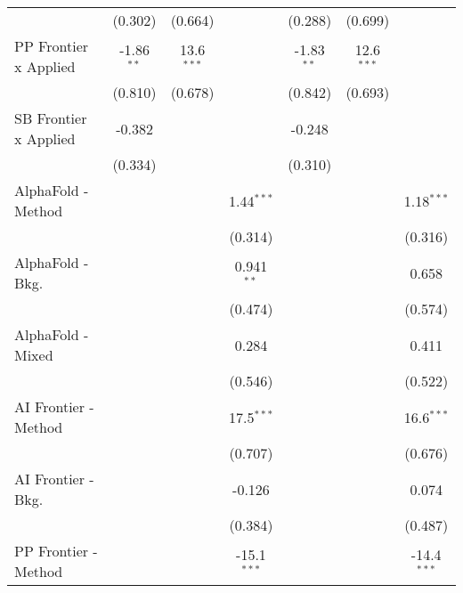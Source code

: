 \begin{tabular}{lcccccc}
                                  & (0.302)       & (0.664)       &                & (0.288)        & (0.699)        &   \\   
   PP Frontier x Applied          & -1.86$^{**}$  & 13.6$^{***}$  &                & -1.83$^{**}$   & 12.6$^{***}$   &   \\   
                                  & (0.810)       & (0.678)       &                & (0.842)        & (0.693)        &   \\   
   SB Frontier x Applied          & -0.382        &               &                & -0.248         &                &   \\   
                                  & (0.334)       &               &                & (0.310)        &                &   \\   
   AlphaFold - Method             &               &               & 1.44$^{***}$   &                &                & 1.18$^{***}$\\   
                                  &               &               & (0.314)        &                &                & (0.316)\\   
   AlphaFold - Bkg.               &               &               & 0.941$^{**}$   &                &                & 0.658\\   
                                  &               &               & (0.474)        &                &                & (0.574)\\   
   AlphaFold - Mixed              &               &               & 0.284          &                &                & 0.411\\   
                                  &               &               & (0.546)        &                &                & (0.522)\\   
   AI Frontier - Method           &               &               & 17.5$^{***}$   &                &                & 16.6$^{***}$\\   
                                  &               &               & (0.707)        &                &                & (0.676)\\   
   AI Frontier - Bkg.             &               &               & -0.126         &                &                & 0.074\\   
                                  &               &               & (0.384)        &                &                & (0.487)\\   
   PP Frontier - Method           &               &               & -15.1$^{***}$  &                &                & -14.4$^{***}$\\   

\end{tabular}
